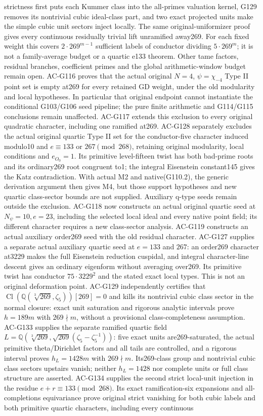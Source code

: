 \documentclass[11pt,a4paper]{article}
\theoremstyle{definition}
\theoremstyle{remark}
\begin{document}
strictness first puts each Kummer class into the all-primes valuation kernel, G129 removes its nontrivial cubic ideal-class part, and two exact projected units make the simple cubic unit sectors inject locally. The same original-uniformizer proof gives every continuous residually trivial lift unramified away269. For each fixed weight this covers $2\cdot269^{m-1}$ sufficient labels of conductor dividing $5\cdot269^m$; it is not a family-average budget or a quartic e133 theorem. Other tame factors, residual branches, coefficient primes and the global arithmetic-window budget remain open. AC-G116 proves that the actual original $N=4$, $\psi=\chi_{-4}$ Type II point set is empty at269 for every retained GD weight, under the old modularity and local hypotheses. In particular that original endpoint cannot instantiate the conditional G103/G106 seed pipeline; the pure finite arithmetic and G114/G115 conclusions remain unaffected. AC-G117 extends this exclusion to every original quadratic character, including one ramified at269. AC-G128 separately excludes the actual original quartic Type II set for the conductor-five character induced modulo10 and $e\equiv133$ or $267\pmod{268}$, retaining original modularity, local conditions and $e_{O_0}=1$. Its primitive level-fifteen twist has both bad-prime roots and its ordinary269 root congruent to1; the integral Eisenstein constant145 gives the Katz contradiction. With actual M2 and native(G110.2), the generic derivation argument then gives M4, but those support hypotheses and new quartic class-sector bounds are not supplied. Auxiliary q-type seeds remain outside the exclusion. AC-G118 now constructs an actual original quartic seed at $N_\psi=10,e=23$, including the selected local ideal and every native point field; its different character requires a new class-sector analysis. AC-G119 constructs an actual auxiliary order269 seed with the old residual character. AC-G127 supplies a separate actual auxiliary quartic seed at $e=133$ and $267$: an order269 character at3229 makes the full Eisenstein reduction cuspidal, and integral character-line descent gives an ordinary eigenform without averaging over269. Its primitive twist has conductor $75\cdot3229^2$ and the stated exact local types. This is not an original deformation point. AC-G129 independently certifies that $\operatorname{Cl}(\mathbb Q(\sqrt[3]{269},\zeta_5))[269]=0$ and kills its nontrivial cubic class sector in the normal closure: exact unit saturation and rigorous analytic intervals prove $h=189m$ with $269\nmid m$, without a provisional class-completeness assumption. AC-G133 supplies the separate ramified quartic field $L=\mathbb Q(\sqrt[3]{269},\sqrt{269}(\zeta_5-\zeta_5^{-1}))$: five exact units are269-saturated, the actual primitive theta/Dirichlet factors and all tails are controlled, and a rigorous interval proves $h_L=1428m$ with $269\nmid m$. Its269-class group and nontrivial cubic class sectors upstairs vanish; neither $h_L=1428$ nor complete units or full class structure are asserted. AC-G134 supplies the second strict local-unit injection in the residue $e+r\equiv133\pmod{268}$. Its exact ramification-six expansions and all-completions equivariance prove original strict vanishing for both cubic labels and both primitive quartic characters, including every continuous 
\end{document}
